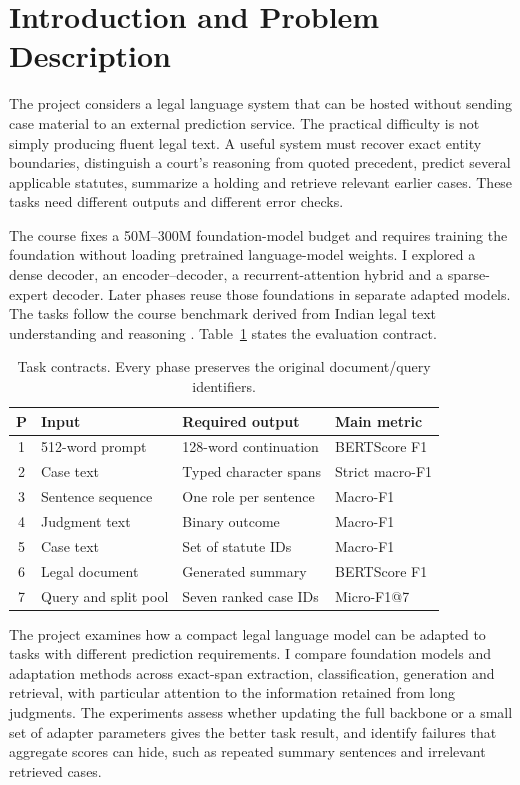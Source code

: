\documentclass[11pt, oneside]{article}
\newcommand{\mainbreak}{\clearpage}
\begin{document}
\mainbreak
\section{Introduction and Problem Description}
The project considers a legal language system that can be hosted without sending case material to an
external prediction service. The practical difficulty is not simply producing fluent legal text. A useful
system must recover exact entity boundaries, distinguish a court's reasoning from quoted precedent,
predict several applicable statutes, summarize a holding and retrieve relevant earlier cases. These tasks
need different outputs and different error checks.

The course fixes a 50M--300M foundation-model budget and requires training the foundation without loading
pretrained language-model weights. I explored a dense decoder, an encoder--decoder, a recurrent-attention
hybrid and a sparse-expert decoder. Later phases reuse those foundations in separate adapted models.
The tasks follow the course benchmark derived from Indian legal text understanding and reasoning
\cite{iltur,coursebrief}. Table~\ref{tab:tasks} states the evaluation contract.

\begin{table}[H]\centering\small
\caption{Task contracts. Every phase preserves the original document/query identifiers.}
\label{tab:tasks}
\begin{tabularx}{\textwidth}{clXX}
\toprule P & Input & Required output & Main metric\\\midrule
1 & 512-word prompt & 128-word continuation & BERTScore F1\\
2 & Case text & Typed character spans & Strict macro-F1\\
3 & Sentence sequence & One role per sentence & Macro-F1\\
4 & Judgment text & Binary outcome & Macro-F1\\
5 & Case text & Set of statute IDs & Macro-F1\\
6 & Legal document & Generated summary & BERTScore F1\\
7 & Query and split pool & Seven ranked case IDs & Micro-F1@7\\\bottomrule
\end{tabularx}\end{table}

The project examines how a compact legal language model can be adapted to tasks with different
prediction requirements. I compare foundation models and adaptation methods across exact-span
extraction, classification, generation and retrieval, with particular attention to the information
retained from long judgments. The experiments assess whether updating the full backbone or a small
set of adapter parameters gives the better task result, and identify failures that aggregate scores
can hide, such as repeated summary sentences and irrelevant retrieved cases.
\end{document}
